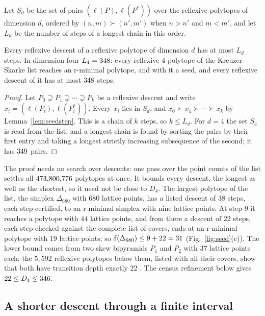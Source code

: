 Let $S_{d}$ be the set of pairs $(\ell(P),\ell(P^{*}))$ over the reflexive polytopes of dimension $d$, ordered by $(n,m)\succ(n',m')$ when $n>n'$ and $m<m'$, and let $L_{d}$ be the number of steps of a longest chain in this order.

\begin{theorem}\label{thm:seedbound}
Every reflexive descent of a reflexive polytope of dimension $d$ has at most $L_{d}$ steps. In dimension four $L_{4}=348$: every reflexive $4$-polytope of the Kreuzer--Skarke list reaches an r-minimal polytope, and with it a seed, and every reflexive descent of it has at most $348$ steps.
\end{theorem}

\begin{proof}
Let $P_{0}\supsetneq P_{1}\supsetneq\cdots\supsetneq P_{k}$ be a reflexive descent and write $x_{i}=(\ell(P_{i}),\ell(P_{i}^{*}))$. Every $x_{i}$ lies in $S_{d}$, and $x_{0}\succ x_{1}\succ\cdots\succ x_{k}$ by Lemma~\ref{lem:seedstep}. This is a chain of $k$ steps, so $k\le L_{d}$. For $d=4$ the set $S_{4}$ is read from the list, and a longest chain is found by sorting the pairs by their first entry and taking a longest strictly increasing subsequence of the second; it has $349$ pairs.
\end{proof}

The proof needs no search over descents: one pass over the point counts of the list settles all $473{,}800{,}776$ polytopes at once. It bounds every descent, the longest as well as the shortest, so it need not be close to $D_{4}$. The largest polytope of the list, the simplex $\Delta_{680}$ with $680$ lattice points, has a listed descent of $38$ steps, each step certified, to an r-minimal simplex with nine lattice points. At step $9$ it reaches a polytope with $44$ lattice points, and from there a descent of $22$ steps, each step checked against the complete list of covers, ends at an r-minimal polytope with $19$ lattice points; so $\delta(\Delta_{680})\le9+22=31$ \cite{BhaSeed} (Fig.~\ref{fig:seed}(c)). The lower bound comes from two skew bipyramids $P_{1}$ and $P_{2}$ with $37$ lattice points each: the $5{,}592$ reflexive polytopes below them, listed with all their covers, show that both have transition depth exactly $22$ \cite{BhaSeed}. The census refinement below gives $22\le D_{4}\le346$.


\subsection{A shorter descent through a finite interval}\label{ssec:seedinterval}

